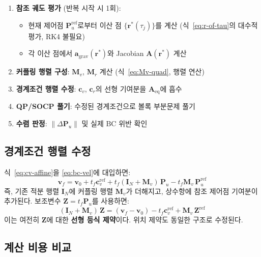 \documentclass[11pt]{article}
\begin{document}
\begin{enumerate}
  \item \textbf{참조 궤도 평가} (반복 시작 시 1회):
    \begin{itemize}
      \item 현재 제어점 $\mathbf{P}_u^\text{ref}$로부터 이산 점
            $\{\mathbf{r}^*(\tau_j)\}$를 계산
            (식~\eqref{eq:r-of-tau}의 대수적 평가, RK4 불필요)
      \item 각 이산 점에서 $\mathbf{a}_\text{grav}(\mathbf{r}^*)$와
            Jacobian $\mathbf{A}(\mathbf{r}^*)$ 계산
    \end{itemize}
  \item \textbf{커플링 행렬 구성}: $\mathbf{M}_v$, $\mathbf{M}_r$ 계산
        (식~\eqref{eq:Mv-quad}, 행렬 연산)
  \item \textbf{경계조건 행렬 수정}: $\mathbf{c}_v$, $\mathbf{c}_r$의 선형 기여분을
        $\mathbf{A}_\text{eq}$에 흡수
  \item \textbf{QP/SOCP 풀기}: 수정된 경계조건으로 볼록 부분문제 풀기
  \item \textbf{수렴 판정}: $\|\Delta\mathbf{P}_u\|$ 및 실제 BC 위반 확인
\end{enumerate}

\subsection{경계조건 행렬 수정}

식~\eqref{eq:cv-affine}을 \eqref{eq:bc-vel}에 대입하면:
\begin{equation}
  \mathbf{v}_f = \mathbf{v}_0 + t_f\mathbf{c}_v^\text{ref}
    + t_f(\mathbf{I}_N + \mathbf{M}_v)\,\mathbf{P}_u
    - t_f \mathbf{M}_v\,\mathbf{P}_u^\text{ref}
\end{equation}
즉, 기존 적분 행렬 $\mathbf{I}_N$에 커플링 행렬 $\mathbf{M}_v$가 더해지고,
상수항에 참조 제어점 기여분이 추가된다.
보조변수 $\mathbf{Z} = t_f\mathbf{P}_u$를 사용하면:
\begin{equation}
  (\mathbf{I}_N + \mathbf{M}_v)\,\mathbf{Z} =
    (\mathbf{v}_f - \mathbf{v}_0) - t_f\mathbf{c}_v^\text{ref}
    + \mathbf{M}_v\,\mathbf{Z}^\text{ref}
  \label{eq:bc-vel-modified}
\end{equation}
이는 여전히 $\mathbf{Z}$에 대한 \textbf{선형 등식 제약}이다.
위치 제약도 동일한 구조로 수정된다.

\subsection{계산 비용 비교}
\end{document}
